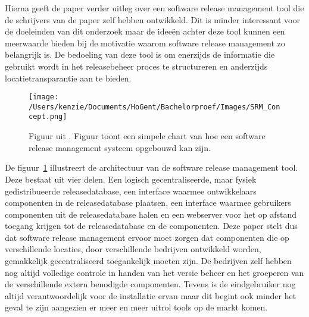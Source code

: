 Hierna geeft de paper \autocite{Hoek2002} verder uitleg over een software release management tool die de schrijvers van de paper zelf hebben ontwikkeld. Dit is minder interessant voor de doeleinden van dit onderzoek maar de ideeën achter deze tool kunnen een meerwaarde bieden bij de motivatie waarom software release management zo belangrijk is. 
\newline
\newline
De bedoeling van deze tool is om enerzijds de informatie die gebruikt wordt in het releasebeheer proces te structureren en anderzijds locatietransparantie aan te bieden.
\begin{figure}[H]
    \centering
    \texttt{[image: /Users/kenzie/Documents/HoGent/Bachelorproef/Images/SRM\_Concept.png]}
    \caption{Figuur uit \autocite{Hoek2002}. Figuur toont een simpele chart van hoe een software release management systeem opgebouwd kan zijn.}
    \label{fig:SRM_arch}
\end{figure}
De figuur~\ref{fig:SRM_arch} illustreert de architectuur van de software release management tool. Deze bestaat uit vier delen. Een logisch gecentraliseerde, maar fysiek gedistribueerde releasedatabase, een interface waarmee ontwikkelaars componenten in de releasedatabase plaatsen, een interface waarmee gebruikers componenten uit de releasedatabase halen en een webserver voor het op afstand toegang krijgen tot de releasedatabase en de componenten.
\newline
\newline
Deze paper \autocite{Hoek2002} stelt dus dat software release management ervoor moet zorgen dat componenten die op verschillende locaties, door verschillende bedrijven ontwikkeld worden, gemakkelijk gecentraliseerd toegankelijk moeten zijn. De bedrijven zelf hebben nog altijd volledige controle in handen van het versie beheer en het groeperen van de verschillende extern benodigde componenten. Tevens is de eindgebruiker nog altijd verantwoordelijk voor de installatie ervan maar dit begint ook minder het geval te zijn aangezien er meer en meer uitrol tools op de markt komen.
\newline
\newline
